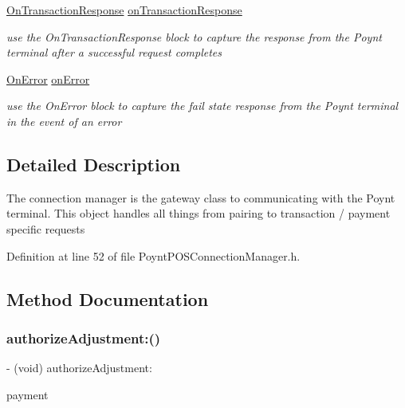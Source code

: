 \begin{DoxyCompactItemize}
\hyperlink{_poynt_p_o_s_connection_manager_8h_ae268209596a83d1d61f8ce4f2513d800}{On\+Transaction\+Response} \hyperlink{interface_poynt_p_o_s_connection_manager_aec722c6cb0f961265852a406242c430b}{on\+Transaction\+Response}
\begin{DoxyCompactList}\small\item\em use the On\+Transaction\+Response block to capture the response from the Poynt terminal after a successful request completes \end{DoxyCompactList}\item 
\hyperlink{_poynt_p_o_s_connection_manager_8h_aef7c4526c1bcdb84233ca3d7f7074d5a}{On\+Error} \hyperlink{interface_poynt_p_o_s_connection_manager_a2ea439a383295e69bc2094a614e3b6fb}{on\+Error}
\begin{DoxyCompactList}\small\item\em use the On\+Error block to capture the fail state response from the Poynt terminal in the event of an error \end{DoxyCompactList}\end{DoxyCompactItemize}


\subsection{Detailed Description}
The connection manager is the gateway class to communicating with the Poynt terminal.  This object handles all things from pairing to transaction / payment specific requests 

Definition at line 52 of file Poynt\+P\+O\+S\+Connection\+Manager.\+h.



\subsection{Method Documentation}
\hypertarget{interface_poynt_p_o_s_connection_manager_a5a35b99719ec02d91ec102d75a49bd7a}{}\label{interface_poynt_p_o_s_connection_manager_a5a35b99719ec02d91ec102d75a49bd7a} 
\subsubsection{\texorpdfstring{authorize\+Adjustment\+:()}{authorizeAdjustment:()}}
{\footnotesize\ttfamily -\/ (void) authorize\+Adjustment\+: \begin{DoxyParamCaption}\item[{(\hyperlink{interface_poynt_payment_object}{Poynt\+Payment\+Object} $\ast$)}]{payment }\end{DoxyParamCaption}}




